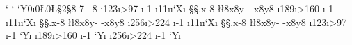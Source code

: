 \lccode`-`-\lccode`Y0\countdef\i0\toksdef\L0\L{}\toksdef\S2\S{8-7 --8 }
\def\y{%
  \i123\def\x{\ifnum\i>97  \advance\i -1 \a\expandafter\x\fi}\x
  \i189\def\x{\ifnum\i>160 \advance\i -1 \a\expandafter\x\fi}\x
  \i256\def\x{\ifnum\i>224 \advance\i -1 \a\expandafter\x\fi}\x}
\def\a{\catcode\i11\lccode\i\i\lccode`X\i
  \lowercase{\S\expandafter{\the\S .X-8 }\L\expandafter{\the\L 8X8Y- -X8Y8 }}}
\y\patterns{\the\S}\def\a{\lccode`Y\i\patterns{\the\L}}\y
